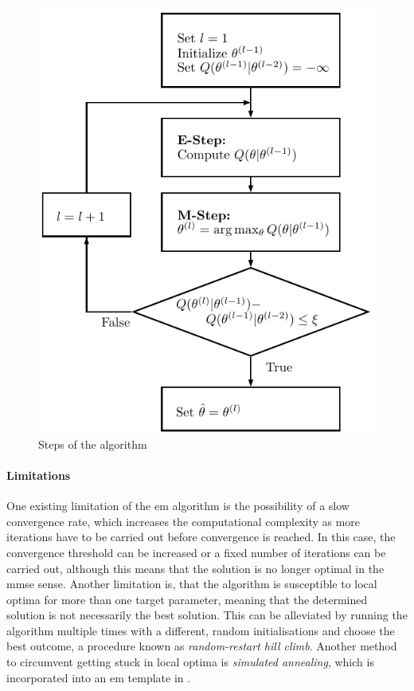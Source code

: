 \begin{figure}[!htb]
\centering
\includegraphics{data/figures/em-flowchart}
\caption{Steps of the  algorithm}
\end{figure}

\paragraph{Limitations}
One existing limitation of the \gls{em} algorithm is the possibility of a slow convergence rate, which increases the computational complexity as more iterations have to be carried out before convergence is reached. In this case, the convergence threshold can be increased or a fixed number of iterations can be carried out, although this means that the solution is no longer optimal in the \gls{mmse} sense. Another limitation is, that the algorithm is susceptible to local optima for more than one target parameter, meaning that the determined solution is not necessarily the best solution. This can be alleviated by running the algorithm multiple times with a different, random initialisations and choose the best outcome, a procedure known as \textit{random-restart hill climb}. Another method to circumvent getting stuck in local optima is \textit{simulated annealing}, which is incorporated into an \gls{em} template in \cite{Guo2007}.


